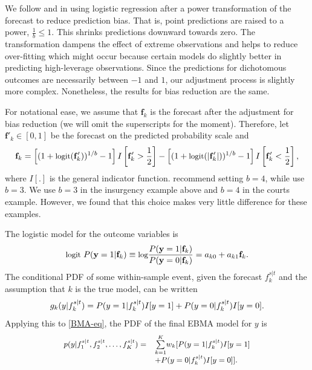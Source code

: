 We follow \citet{Sloughter:2007} and \citet{Hamill:2004} in using
logistic regression after a power transformation of the forecast to
reduce prediction bias.  That is, point predictions are raised
to a power, $\frac{1}{b} \le 1$.  This shrinks predictions downward
towards zero.  The transformation dampens the effect of extreme
observations and helps to reduce over-fitting which might occur
because certain models do slightly better in predicting high-leverage
observations.  Since the predictions for dichotomous outcomes are
necessarily between $-1$ and $1$, our adjustment process is slightly
more complex.  Nonetheless, the results for bias reduction are the same.

For notational ease, we assume that $\mathbf{f}_k$ is the forecast
after the adjustment for bias reduction (we will omit the superscripts
for the moment).  Therefore, let $\mathbf{f}'_k \in [0,1]$ be the
forecast on the predicted probability scale and
\begin{equation}
\small
\mathbf{f}_k =  \left[(1+\mbox{logit}(\mathbf{f}'_k))^{1/b} - 1\right]I\left[\mathbf{f}'_k>\frac{1}{2}\right]  - \left[(1+\mbox{logit}(|\mathbf{f}'_k|))^{1/b} -  1\right]I\left[\mathbf{f}'_k<\frac{1}{2}\right],
 \end{equation}
 \noindent where $I[.]$ is the general indicator function.
 \citet{Hamill:2004} recommend setting $b=4$, while
 \citet{Sloughter:2007} use $b=3$.  We use $b=3$ in the insurgency
 example above and $b=4$ in the courts example.  However, we found
 that this choice makes very little difference for these examples.

The logistic model for the outcome variables is %
\begin{equation} \small
\label{one}
\mbox{logit } P(\mathbf{y}=1|\mathbf{f}_k) \equiv \mbox{log}\frac{P(\mathbf{y}=1|\mathbf{f}_k)}{P(\mathbf{y}=0|\mathbf{f}_k)} = a_{k0}+a_{k1}\mathbf{f}_k .
\end{equation}
\noindent The conditional PDF of some within-sample event, given the
forecast $f_{k}^{s|t}$ and the assumption that $k$ is the true model, can
be written
\begin{equation} 
\label{component-eq}
\small
g_k(y|f_{k}^{s|t}) = P(y=1|f_{k}^{s|t})I[y=1]  + P(y=0|f_{k}^{s|t})I[y=0].
\end{equation}
Applying this to \eqref{BMA-eq}, the PDF of the final EBMA model for
$y$ is
\begin{equation}
\label{pdf}
\small
\begin{array}{rl}
p(y|f_{1}^{s|t}, f_{2}^{s|t}, \ldots, f_{K}^{s|t}) = &
\overset{K}{\underset{k=1}{\sum}} w_k [
P(y=1|f_{k}^{s|t})I[y=1] \\
& + P(y=0|f_{k}^{s|t})I[y=0] ].\end{array}
\end{equation}



